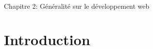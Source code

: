 \documentclass[12pt, letterpaper]{article}
\begin{document}
\begin{center}
    \huge{Chapitre 2: Généralité sur le développement web}
\end{center}
\section{Introduction}


\section{}
\end{document}
